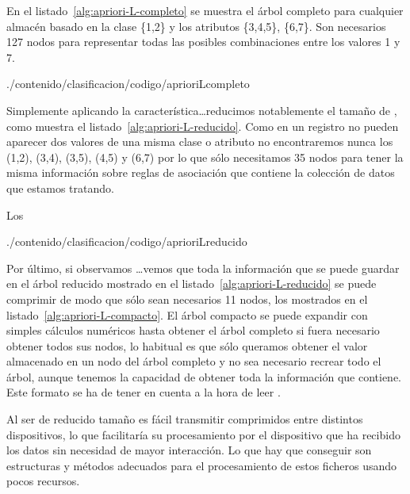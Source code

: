 En el listado~\ref{alg:apriori-L-completo} se muestra el árbol \aprioriL completo para cualquier almacén \D basado en la clase \{1,2\} y los atributos \{3,4,5\}, \{6,7\}. Son necesarios 127 nodos para representar todas las posibles combinaciones entre los valores 1 y 7.

\afterpage{\clearpage}

                 {./contenido/clasificacion/codigo/aprioriLcompleto}


Simplemente aplicando la característica\ldots reducimos notablemente el tamaño de \aprioriL, como muestra el listado~\ref{alg:apriori-L-reducido}. Como en un registro no pueden aparecer dos valores de una misma clase o atributo no encontraremos nunca los \itemsets (1,2), (3,4), (3,5), (4,5) y (6,7) por lo que sólo necesitamos 35 nodos para tener la misma información sobre reglas de asociación que contiene la colección de datos que estamos tratando. 

Los

\afterpage{\clearpage}

                 {./contenido/clasificacion/codigo/aprioriLreducido}

Por último, si observamos \ldots vemos que toda la información que se puede guardar en el árbol \aprioriL reducido mostrado en el listado~\ref{alg:apriori-L-reducido} se puede comprimir de modo que sólo sean necesarios 11 nodos, los mostrados en el listado~\ref{alg:apriori-L-compacto}. El árbol \aprioriL compacto se puede expandir con simples cálculos numéricos hasta obtener el árbol \aprioriL completo si fuera necesario obtener todos sus nodos, lo habitual es que sólo queramos obtener el valor almacenado en un nodo del árbol \aprioriL completo y no sea necesario recrear todo el árbol, aunque tenemos la capacidad de obtener toda la información que contiene. Este formato se ha de tener en cuenta a la hora de leer \D.

Al ser de reducido tamaño es fácil transmitir \catalogos comprimidos entre distintos dispositivos, lo que facilitaría su procesamiento por el dispositivo que ha recibido los datos sin necesidad de mayor interacción. Lo que hay que conseguir son estructuras y métodos adecuados para el procesamiento de estos ficheros usando pocos recursos.

